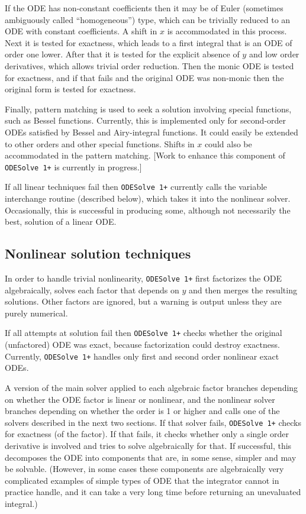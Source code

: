 \documentclass[a4paper]{article} %
\newcommand{\ODESolve}[1]{\texttt{ODESolve\,#1}}
\begin{document}
If the ODE has non-constant coefficients then it may be of Euler
(sometimes ambiguously called ``homogeneous'') type, which can be
trivially reduced to an ODE with constant coefficients.  A shift in
$x$ is accommodated in this process.  Next it is tested for exactness,
which leads to a first integral that is an ODE of order one lower.
After that it is tested for the explicit absence of $y$ and low order
derivatives, which allows trivial order reduction.  Then the monic ODE
is tested for exactness, and if that fails and the original ODE was
non-monic then the original form is tested for exactness.

Finally, pattern matching is used to seek a solution involving special
functions, such as Bessel functions.  Currently, this is implemented
only for second-order ODEs satisfied by Bessel and Airy-integral
functions.  It could easily be extended to other orders and other
special functions.  Shifts in $x$ could also be accommodated in the
pattern matching.  [Work to enhance this component of \ODESolve{1+} is
currently in progress.]

If all linear techniques fail then \ODESolve{1+} currently calls the
variable interchange routine (described below), which takes it into
the nonlinear solver.  Occasionally, this is successful in producing
some, although not necessarily the best, solution of a linear ODE.


\subsection{Nonlinear solution techniques}

In order to handle trivial nonlinearity, \ODESolve{1+} first
factorizes the ODE algebraically, solves each factor that depends on
$y$ and then merges the resulting solutions.  Other factors are
ignored, but a warning is output unless they are purely numerical.

If all attempts at solution fail then \ODESolve{1+} checks whether the
original (unfactored) ODE was exact, because factorization could
destroy exactness.  Currently, \ODESolve{1+} handles only first and
second order nonlinear exact ODEs.

A version of the main solver applied to each algebraic factor branches
depending on whether the ODE factor is linear or nonlinear, and the
nonlinear solver branches depending on whether the order is 1 or
higher and calls one of the solvers described in the next two
sections.  If that solver fails, \ODESolve{1+} checks for exactness
(of the factor).  If that fails, it checks whether only a single order
derivative is involved and tries to solve algebraically for that.  If
successful, this decomposes the ODE into components that are, in some
sense, simpler and may be solvable.  (However, in some cases these
components are algebraically very complicated examples of simple types
of ODE that the integrator cannot in practice handle, and it can take
a very long time before returning an unevaluated integral.)
\end{document}
